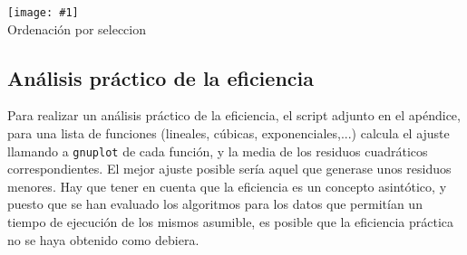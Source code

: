 \documentclass[a4paper, 11pt]{article} %
\newcommand{\imagen}[2]{\begin{figure*}[ht!] \centering  \texttt{[image: \#1]} \\ #2 \end{figure*}}
\begin{document}
\imagen{../regressionPlots/seleccion_fit.jpg}{Ordenación por seleccion}

\subsection{Análisis práctico de la eficiencia}
Para realizar un análisis práctico de la eficiencia, el script adjunto en el
apéndice, para una lista de funciones (lineales, cúbicas, exponenciales,...) 
calcula el ajuste llamando a \texttt{gnuplot} de cada función, y la media
de los residuos cuadráticos correspondientes. El mejor ajuste posible sería
aquel que generase unos residuos menores. Hay que tener en cuenta que la 
eficiencia es un concepto asintótico, y puesto que se han evaluado los algoritmos
para los datos que permitían un tiempo de ejecución de los mismos asumible, 
es posible que la eficiencia práctica no se haya obtenido como debiera.
\end{document}

